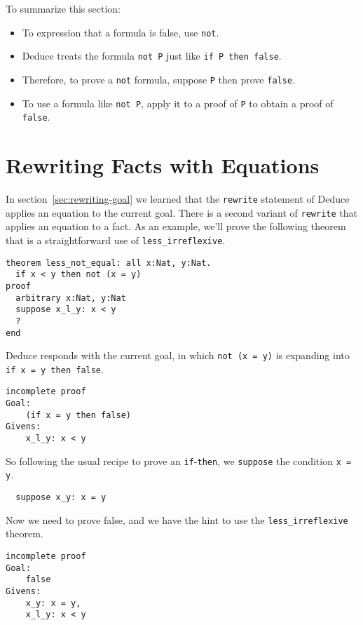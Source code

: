 \documentclass[12pt]{article}
\begin{document}
To summarize this section:
\begin{itemize}
\item To expression that a formula is false, use \texttt{not}.
\item Deduce treats the formula \texttt{not P} just like \texttt{if P
  then false}.
\item Therefore, to prove a \texttt{not} formula, suppose \texttt{P}
  then prove \texttt{false}.
\item To use a formula like \texttt{not P}, apply it to a proof of
  \texttt{P} to obtain a proof of \texttt{false}.
\end{itemize}

\section{Rewriting Facts with Equations}
\label{sec:rewriting-facts}  

In section~\ref{sec:rewriting-goal} we learned that the
\texttt{rewrite} statement of Deduce applies an equation to the
current goal.  There is a second variant of \texttt{rewrite} that
applies an equation to a fact. As an example, we'll prove the
following theorem that is a straightforward use of
\texttt{less\_irreflexive}.

\begin{verbatim}
theorem less_not_equal: all x:Nat, y:Nat.
  if x < y then not (x = y)
proof
  arbitrary x:Nat, y:Nat
  suppose x_l_y: x < y
  ?
end
\end{verbatim}

Deduce responds with the current goal, in which \texttt{not (x = y)} is
expanding into \texttt{if x = y then false}.

\begin{verbatim}
incomplete proof
Goal:
	(if x = y then false)
Givens:
	x_l_y: x < y
\end{verbatim}

So following the usual recipe to prove an \texttt{if}-\texttt{then},
we \texttt{suppose} the condition \texttt{x = y}.

\begin{verbatim}
  suppose x_y: x = y
\end{verbatim}

Now we need to prove false, and we have the hint to use the
\texttt{less\_irreflexive} theorem.

\begin{verbatim}
incomplete proof
Goal:
	false
Givens:
	x_y: x = y,
	x_l_y: x < y
\end{verbatim}
\end{document}
